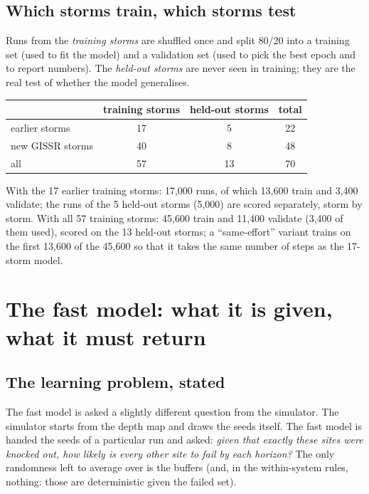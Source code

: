 \documentclass[11pt]{article}
\begin{document}
\subsection{Which storms train, which storms test}\label{sub:split}

Runs from the \emph{training storms} are shuffled once and split 80/20 into a training set (used to fit the model) and a validation set (used to pick the best epoch and to report numbers). The \emph{held-out storms} are never seen in training; they are the real test of whether the model generalises.

\begin{center}\small
\begin{tabular}{lccc}
\toprule
 & training storms & held-out storms & total\\
\midrule
earlier storms & 17 & 5 & 22\\
new GISSR storms & 40 & 8 & 48\\
all & 57 & 13 & 70\\
\bottomrule
\end{tabular}
\end{center}

With the 17 earlier training storms: 17,000 runs, of which 13,600 train and 3,400 validate; the runs of the 5 held-out storms (5,000) are scored separately, storm by storm. With all 57 training storms: 45,600 train and 11,400 validate (3,400 of them used), scored on the 13 held-out storms; a ``same-effort'' variant trains on the first 13,600 of the 45,600 so that it takes the same number of steps as the 17-storm model.

\section{The fast model: what it is given, what it must return}\label{sec:model}

\subsection{The learning problem, stated}\label{sub:learnproblem}

The fast model is asked a slightly different question from the simulator. The simulator starts from the depth map and draws the seeds itself. The fast model is handed the seeds of a particular run and asked: \emph{given that exactly these sites were knocked out, how likely is every other site to fail by each horizon?} The only randomness left to average over is the buffers (and, in the within-system rules, nothing: those are deterministic given the failed set).
\end{document}
